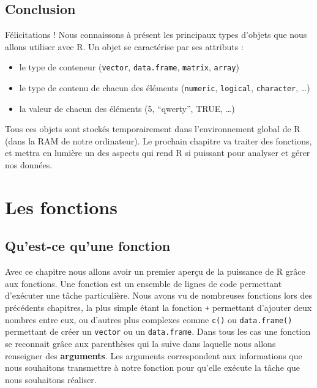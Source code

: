 \documentclass[twoside,symmetric]{book}
\providecommand{\tightlist}{%
  \setlength{\itemsep}{0pt}\setlength{\parskip}{0pt}}
\begin{document}
\hypertarget{conclusion-3}{%
\section{Conclusion}\label{conclusion-3}}

Félicitations ! Nous connaissons à présent les principaux types d'objets que nous allons utiliser avec R. Un objet se caractérise par ses attributs :

\begin{itemize}
\tightlist
\item
  le type de conteneur (\texttt{vector}, \texttt{data.frame}, \texttt{matrix}, \texttt{array})
\item
  le type de contenu de chacun des éléments (\texttt{numeric}, \texttt{logical}, \texttt{character}, \ldots{})
\item
  la valeur de chacun des éléments (5, ``qwerty'', TRUE, \ldots{})
\end{itemize}

Tous ces objets sont stockés temporairement dans l'environnement global de R (dans la RAM de notre ordinateur). Le prochain chapitre va traiter des fonctions, et mettra en lumière un des aspects qui rend R si puissant pour analyser et gérer nos données.

\hypertarget{fonctions}{%
\chapter{Les fonctions}\label{fonctions}}

\minitoc

\hypertarget{quest-ce-quune-fonction}{%
\section{Qu'est-ce qu'une fonction}\label{quest-ce-quune-fonction}}

Avec ce chapitre nous allons avoir un premier aperçu de la puissance de R grâce aux fonctions. Une fonction est un ensemble de lignes de code permettant d'exécuter une tâche particulière. Nous avons vu de nombreuses fonctions lors des précédents chapitres, la plus simple étant la fonction \texttt{+} permettant d'ajouter deux nombres entre eux, ou d'autres plus complexes comme \texttt{c()} ou \texttt{data.frame()} permettant de créer un \texttt{vector} ou un \texttt{data.frame}. Dans tous les cas une fonction se reconnait grâce aux parenthèses qui la suive dans laquelle nous allons renseigner des \textbf{arguments}. Les arguments correspondent aux informations que nous souhaitons transmettre à notre fonction pour qu'elle exécute la tâche que nous souhaitons réaliser.
\end{document}
